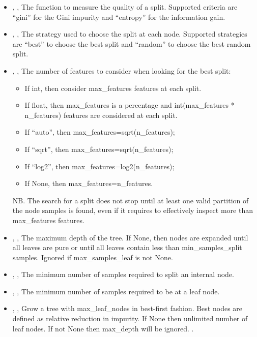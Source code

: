 \begin{itemize}
  \item {}, ,
  The function to measure the quality of a split.
  Supported criteria are ``gini'' for the Gini impurity and ``entropy'' for the
  information gain.
  \item {}, ,
  The strategy used to choose the split at each node.
  Supported strategies are ``best'' to choose the best split and ``random'' to
  choose the best random split.
  \item {}, ,
  The number of features to consider when looking for the best split:
\begin{itemize}
    \item If int, then consider max\_features features at each split.
    \item If float, then max\_features is a percentage and int(max\_features *
    n\_features) features are considered at each split.
    \item If “auto”, then max\_features=sqrt(n\_features);
    \item If “sqrt”, then max\_features=sqrt(n\_features);
    \item If “log2”, then max\_features=log2(n\_features);
    \item If None, then max\_features=n\_features.
\end{itemize}
  NB.
  The search for a split does not stop until at least one valid partition of the
  node samples is found, even if it requires to effectively inspect more than
  max\_features features.
  \\
  \item {}, ,
  The maximum depth of the tree.
  If None, then nodes are expanded until all leaves are pure or until all leaves
  contain less than min\_samples\_split samples.
  Ignored if max\_samples\_leaf is not None.
  \item {}, ,
  The minimum number of samples required to split an internal node.
  \item {}, ,
  The minimum number of samples required to be at a leaf node.
  \item {}, ,
  Grow a tree with max\_leaf\_nodes in best-first fashion.
  Best nodes are defined as relative reduction in impurity.
  If None then unlimited number of leaf nodes.
  If not None then max\_depth will be ignored.
  .
\end{itemize}
